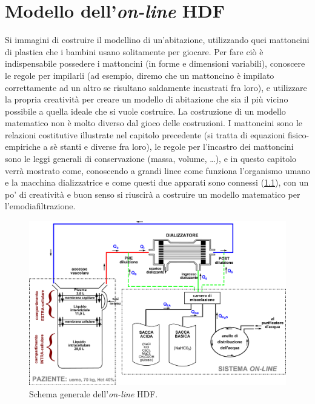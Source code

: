 \chapter{Modello dell'\textit{on-line} HDF}\label{ch:online}

Si immagini di costruire il modellino di un'abitazione, utilizzando quei mattoncini di plastica che i bambini usano solitamente per giocare. Per fare ciò è indispensabile possedere i mattoncini (in forme e dimensioni variabili), conoscere le regole per impilarli (ad esempio, diremo che un mattoncino è impilato correttamente ad un altro se risultano saldamente incastrati fra loro), e utilizzare la propria creatività per creare un modello di abitazione che sia il più vicino possibile a quella ideale che si vuole costruire. La costruzione di un modello matematico non è molto diverso dal gioco delle costruzioni. I mattoncini sono le relazioni costitutive illustrate nel capitolo precedente (si tratta di equazioni fisico-empiriche a sè stanti e diverse fra loro), le regole per l'incastro dei mattoncini sono le leggi generali di conservazione (massa, volume, \ldots), e in questo capitolo verrà mostrato come, conoscendo a grandi linee come funziona l'organismo umano e la macchina dializzatrice e come questi due apparati sono connessi (\figurename\ref{schema_generale}), con un po' di creatività e buon senso si riuscirà a costruire un modello matematico per l'emodiafiltrazione.
\begin{figure}[htbp]
	\centering
		\includegraphics[width=\textwidth]{immagini/schema_generale.eps}
	\caption{Schema generale dell'\textit{on-line} HDF.}
	\label{schema_generale}
\end{figure}





